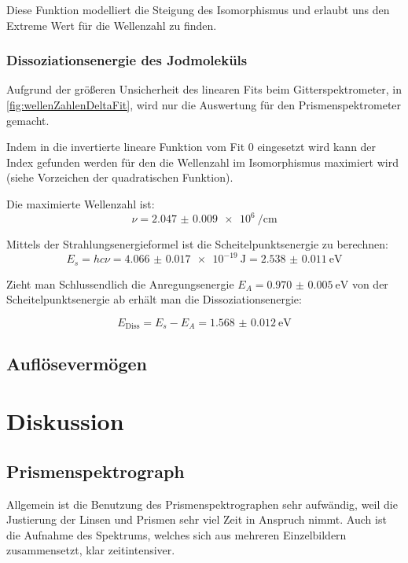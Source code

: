 \documentclass[12pt,english,ngerman]{scrartcl}
\begin{document}
Diese Funktion modelliert die Steigung des Isomorphismus und erlaubt uns den
Extreme Wert für die Wellenzahl zu finden.

\subsubsection{Dissoziationsenergie des Jodmoleküls}
Aufgrund der größeren Unsicherheit des linearen Fits beim Gitterspektrometer,
in \autoref{fig:wellenZahlenDeltaFit}, wird nur die Auswertung für den
Prismenspektrometer gemacht.

Indem in die invertierte lineare Funktion vom Fit 0 eingesetzt wird kann der
Index gefunden werden für den die Wellenzahl im Isomorphismus maximiert wird
(siehe Vorzeichen der quadratischen Funktion).

Die maximierte Wellenzahl ist:
\begin{equation}
	\nu = \SI{2.047(9)e6}{\per\cm}
\end{equation}

Mittels der Strahlungsenergieformel ist die Scheitelpunktsenergie zu berechnen:
\begin{equation}
	E_s = h c \nu = \SI{4.066(17)e-19}{\joule} = \SI{2.538(11)}{\electronvolt}
\end{equation}

Zieht man Schlussendlich die Anregungsenergie
$E_A=\SI{0.970(5)}{\electronvolt}$ von der Scheitelpunktsenergie ab erhält man
die Dissoziationsenergie:

\begin{equation}
	E_\text{Diss} = E_s - E_A = \SI{1.568(12)}{\electronvolt}
\end{equation}

\subsection{Auflösevermögen}


\section{Diskussion}\label{sec:disk}

\subsection{Prismenspektrograph}

Allgemein ist die Benutzung des Prismenspektrographen sehr aufwändig, weil die
Justierung der Linsen und Prismen sehr viel Zeit in Anspruch nimmt. Auch ist
die Aufnahme des Spektrums, welches sich aus mehreren Einzelbildern
zusammensetzt, klar zeitintensiver.
\end{document}
